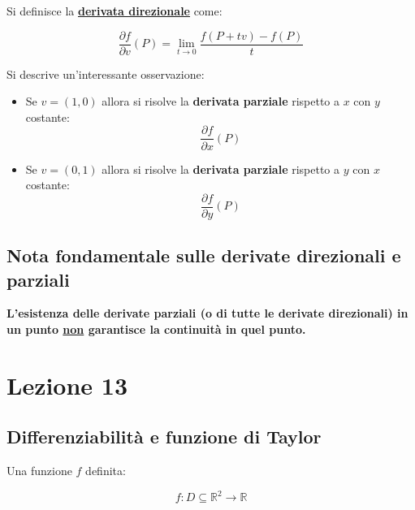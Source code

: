 \documentclass[a4paper]{article}
\begin{document}
	\noindent
	Si definisce la \textcolor{Red3}{\textbf{\underline{derivata direzionale}}} come:
	
	\begin{equation*}
		\dfrac{\partial f}{\partial v}\left(P\right) = \lim_{t \rightarrow 0} \dfrac{f\left(P + tv\right) - f\left(P\right)}{t}
	\end{equation*}

	\noindent
	Si descrive un'interessante osservazione:
	
	\begin{itemize}[label=]
		\item Se $v = \left(1,0\right)$ allora si risolve la \textbf{derivata parziale} rispetto a $x$ con $y$ costante:
		\begin{equation*}
			\dfrac{\partial f}{\partial x}\left(P\right)
		\end{equation*}
	
		\item Se $v = \left(0,1\right)$ allora si risolve la \textbf{derivata parziale} rispetto a $y$ con $x$ costante:
		\begin{equation*}
			\dfrac{\partial f}{\partial y}\left(P\right)
		\end{equation*}
	\end{itemize}

	\subsection{Nota fondamentale sulle derivate direzionali e parziali}
	
	\textbf{L'esistenza delle derivate parziali (o di tutte le derivate direzionali) in un punto \underline{non} garantisce la continuità in quel punto.}
	
	\newpage
	
	\section{Lezione 13}
	
	\subsection{Differenziabilità e funzione di Taylor}\label{differenziabilità}\label{funzione di Taylor}
	
	Una funzione $f$ definita:
	
	\begin{equation*}
		f: D \subseteq \mathbb{R}^{2} \longrightarrow \mathbb{R}
	\end{equation*}
	
\end{document}
